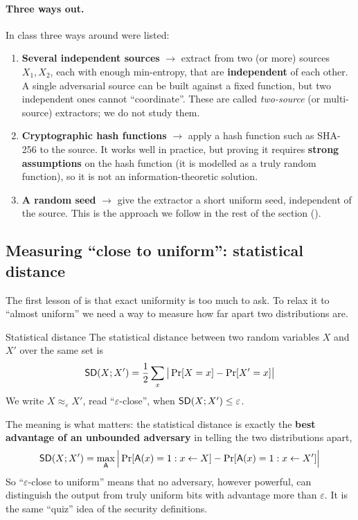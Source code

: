 \paragraph{Three ways out.} In class three ways around  were listed:
\begin{enumerate}
  \item \textbf{Several independent sources} $\to$ extract from two (or more) sources $X_1, X_2$, each with enough min-entropy, that are \textbf{independent} of each other. A single adversarial source can be built against a fixed function, but two independent ones cannot ``coordinate''. These are called \textit{two-source} (or multi-source) extractors; we do not study them.
  \item \textbf{Cryptographic hash functions} $\to$ apply a hash function such as SHA-256 to the source. It works well in practice, but proving it requires \textbf{strong assumptions} on the hash function (it is modelled as a truly random function), so it is not an information-theoretic solution.
  \item \textbf{A random seed} $\to$ give the extractor a short uniform seed, independent of the source. This is the approach we follow in the rest of the section ().
\end{enumerate}

\subsection{Measuring ``close to uniform'': statistical distance}\label{sec:sd}

The first lesson of  is that exact uniformity is too much to ask. To relax it to ``almost uniform'' we need a way to measure how far apart two distributions are.

\begin{frameddefn}[label={def:sd}]{Statistical distance}
  The statistical distance between two random variables $X$ and $X'$ over the same set is
  \[
    \mathsf{SD}(X; X') = \frac{1}{2} \sum_x \big|\Pr[X = x] - \Pr[X' = x]\big|
  \]
  We write $X \approx_\varepsilon X'$, read ``$\varepsilon$-close'', when $\mathsf{SD}(X; X') \leq \varepsilon$.
\end{frameddefn}

The meaning is what matters: the statistical distance is exactly the \textbf{best advantage of an unbounded adversary} in telling the two distributions apart,
\[
  \mathsf{SD}(X; X') = \max_{\mathsf{A}} \Big|\Pr[\mathsf{A}(x) = 1 : x \leftarrow X] - \Pr[\mathsf{A}(x) = 1 : x \leftarrow X']\Big|
\]
So ``$\varepsilon$-close to uniform'' means that no adversary, however powerful, can distinguish the output from truly uniform bits with advantage more than $\varepsilon$. It is the same ``quiz'' idea of the security definitions.

